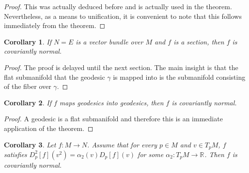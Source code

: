\documentclass[11pt]{article}
\newtheorem{cor}{Corollary}
\theoremstyle{remark}
\begin{document}
\begin{proof}
This was actually deduced before and is actually used in the
theorem. Nevertheless, as a means to unification, it is convenient to
note that this follows immediately from the theorem. 
\end{proof}

\begin{cor}
If $N =E$ is a vector bundle over $M$ and $f$ is a section, then $f$
is covariantly normal. 
\end{cor}

\begin{proof}
The proof is delayed until the next section. The main insight is that
the flat submanifold that the geodesic $\gamma$ is mapped into is the
submanifold consisting of the fiber over $\gamma$.
\end{proof}

\begin{cor} \label{tc:geo2}
If $f$ maps geodesics into geodesics, then $f$ is covariantly normal.
\end{cor}

\begin{proof}
A geodesic is a flat submanifold and therefore this is an immediate
application of the theorem.
\end{proof}

\begin{cor} \label{tc:scal}
Let $f: M \to N$. Assume that for every $p\in M$ and $v\in \ensuremath{T_p M}$,  
$f$ satisfies $\ensuremath{D_{p}^{2} {[f]} ({v^2}) } = \alpha_2(v)\ensuremath{D_{p}^{} {[f]} ({v}) }$ for
some $\alpha_2: \ensuremath{T_p M} \to \ensuremath{\mathbb{R}^{}}$.  
Then $f$ is covariantly normal. 
\end{cor}
\end{document}
